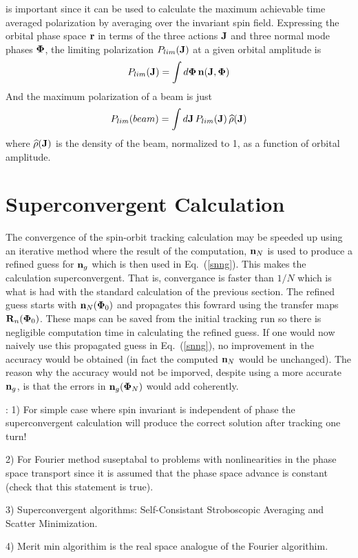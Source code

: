 \documentclass{hitec}
\newcommand{\Bf}[1]{{\bf #1}}
\newcommand{\bfn}{{\Bf n}}
\newcommand{\bfr}{{\Bf r}}
\newcommand{\bfJ}{{\Bf J}}
\newcommand{\bfR}{{\Bf R}}
\newcommand{\bfPhi}{{\Bf \Phi}}
\newcommand{\Plim}{P_{lim}}
\newcommand{\Begineq}{\begin{equation}}
\newcommand{\Endeq}{\end{equation}}
\newcommand{\Eq}[1]{{Eq.~(\protect\ref{#1})}}
\begin{document}
is important since it can be used to
calculate the maximum achievable time averaged polarization by averaging over the invariant spin
field. Expressing the orbital phase space $\bfr$ in terms of the three actions $\bfJ$ and three normal
mode phases $\bfPhi$, the limiting polarization $\Plim(\bfJ)$ at a given orbital amplitude is
\Begineq
  \Plim(\bfJ) = \int d\bfPhi \, \bfn(\bfJ, \bfPhi)
\Endeq
And the maximum polarization of a beam is just
\Begineq
   \Plim(beam) = \int d\bfJ \, \Plim(\bfJ) \, \widehat\rho(\bfJ) 
\Endeq
where $\widehat\rho(\bfJ)$ is the density of the beam, normalized to 1, as a function of orbital
amplitude.

\section{Superconvergent Calculation}

The convergence of the spin-orbit tracking calculation may be speeded up using an iterative method
where the result of the computation, $\bfn_N$ is used to produce a refined guess for $\bfn_g$ which
is then used in \Eq{snng}. This makes the calculation superconvergent. That is, convergance is
faster than $1/N$ which is what is had with the standard calculation of the previous section. The
refined guess starts with $\bfn_N(\bfPhi_0)$ and propagates this fowrard using the transfer maps
$\bfR_n(\bfPhi_0)$. These maps can be saved from the initial tracking run so there is negligible
computation time in calculating the refined guess. If one would now naively use this propagated
guess in \Eq{snng}, no improvement in the accuracy would be obtained (in fact the computed $\bfn_N$
would be unchanged). The reason why the accuracy would not be imporved, despite using a more
accurate $\bfn_g$, is that the errors in $\bfn_g(\bfPhi_N)$ would add coherently. 



\Notes:
1) For simple case where spin invariant is independent of phase the superconvergent calculation will produce the
correct solution after tracking one turn!

2) For Fourier method suseptabal to problems with nonlinearities in the phase space transport since it is assumed
that the phase space advance is constant (check that this statement is true).

3) Superconvergent algorithms: Self-Consistant Stroboscopic Averaging and Scatter Minimization.

4) Merit min algorithim is the real space analogue of the Fourier algorithim.
\end{document}
